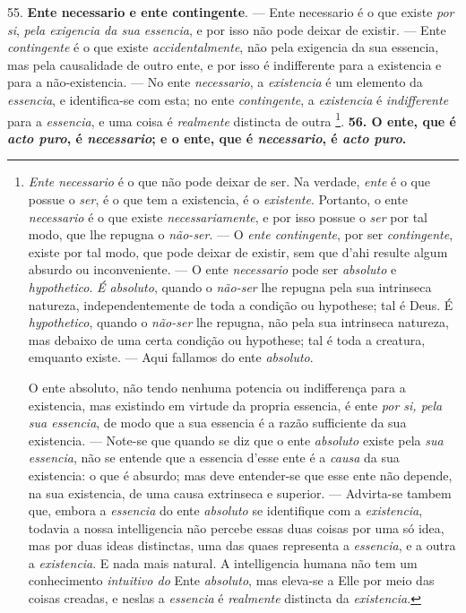  55. \textbf{Ente necessario e ente contingente}. --- Ente necessario é o que existe \emph{por si}, \emph{pela exigencia da sua essencia}, e por isso não pode deixar de existir. --- Ente \emph{contingente} é o que existe \emph{accidentalmente}, não pela exigencia da sua essencia, mas pela causalidade de outro ente, e por isso é indifferente para a existencia e para a não-existencia. --- No ente \emph{necessario}, a \emph{existencia} é um elemento da \emph{essencia}, e identifica-se com esta; no ente \emph{contingente}, a \emph{existencia} é \emph{indifferente} para a \emph{essencia}, e uma coisa é \emph{realmente} distincta de outra \footnote{\emph{Ente necessario} é o que não pode deixar de ser. Na verdade, \emph{ente} é o que possue o \emph{ser}, é o que tem a existencia, é o \emph{existente}. Portanto, o ente \emph{necessario} é o que existe \emph{necessariamente}, e por isso possue o \emph{ser} por tal modo, que lhe repugna o \emph{não-ser}. --- O \emph{ente contingente}, por ser \emph{contingente}, existe por tal modo, que pode deixar de existir, sem que d'ahi resulte algum absurdo ou inconveniente. --- O ente \emph{necessario} pode ser \emph{absoluto} e \emph{hypothetico}. \emph{É absoluto}, quando o \emph{não-ser} lhe repugna pela sua intrinseca natureza, independentemente de toda a condição ou hypothese; tal é Deus. É \emph{hypothetico}, quando o \emph{não-ser} lhe repugna, não pela sua intrinseca natureza, mas debaixo de uma certa condição ou hypothese; tal é toda a creatura, emquanto existe. --- Aqui fallamos do ente \emph{absoluto}.\par O ente absoluto, não tendo nenhuma potencia ou indifferença para a existencia, mas existindo em virtude da propria essencia, é ente \emph{por si, pela sua essencia}, de modo que a sua essencia é a razão sufficiente da sua existencia. --- Note-se que quando se diz que o ente \emph{absoluto} existe pela \emph{sua essencia}, não se entende que a essencia d'esse ente é a \emph{causa} da sua existencia: o que é absurdo; mas deve entender-se que esse ente não depende, na sua existencia, de uma causa extrinseca e superior. --- Advirta-se tambem que, embora a \emph{essencia} do ente \emph{absoluto} se identifique com a \emph{existencia}, todavia a nossa intelligencia não percebe essas duas coisas por uma só idea, mas por duas ideas distinctas, uma das quaes representa a \emph{essencia}, e a outra a \emph{existencia}. E nada mais natural. A intelligencia humana não tem um conhecimento \emph{intuitivo do} Ente \emph{absoluto}, mas eleva-se a Elle por meio das coisas creadas, e neslas a \emph{essencia} é \emph{realmente} distincta da \emph{existencia}.}.
\textbf{56. O ente, que é \emph{acto puro}, é \emph{necessario}; e o ente, que é \emph{necessario}, é \emph{acto puro}.}

